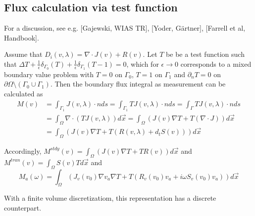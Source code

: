 \documentclass[12pt]{amsproc}
\begin{document}
\subsection{Flux calculation via test function}
For a discussion, see e.g. [Gajewski, WIAS TR],  [Yoder, Gärtner], [Farrell et al, Handbook].

Assume that $D_i(v,\lambda) = \nabla \cdot J(v) + R(v)$. Let $T$ be be a test function
such that $\Delta T    +\frac1\epsilon\delta_{\Gamma_0}(T)
+\frac1\epsilon\delta_{\Gamma_1}(T-1)=0$, which for $\epsilon\to 0$  corresponds to
a mixed boundary value problem with $T=0$ on $\Gamma_0$, $T=1$ on $\Gamma_1$ and $\partial_n T=0$ on
$\partial\Omega \setminus  (\Gamma_0 \cup \Gamma_1)$.
Then the boundary flux integral as measurement can be calculated as
\begin{align*}
  M(v)&=\int_{\Gamma_1} J(v,\lambda)\cdot n ds
      =\int_{\Gamma_1} T J(v,\lambda)\cdot n ds
      =\int_{\Gamma} T J(v,\lambda)\cdot n ds\\
      &=\int_{\Omega} \nabla\cdot \left(T J(v,\lambda)\right) d\vec x
      =\int_\Omega \left(J(v) \nabla T + T (\nabla \cdot J)\right) d\vec x\\
      &=\int_\Omega \left(J(v) \nabla T + T (R(v,\lambda) + d_t S(v))\right) d\vec x
\end{align*}


Accordingly, $M^{stdy}(v)=\int_\Omega \left(J(v) \nabla T + T R(v)\right) d\vec x$ and
  $M^{tran}(v) = \int_{\Omega} S(v) T d\vec x$
and
$$M_a(\omega)= \int_\Omega \left(J_v(v_0)\nabla v_a \nabla T + T (R_v(v_0)v_a + i\omega S_v(v_0)v_a)\right) d\vec x$$

With a finite volume discretizatiom, this representation has a discrete counterpart.
\end{document}
